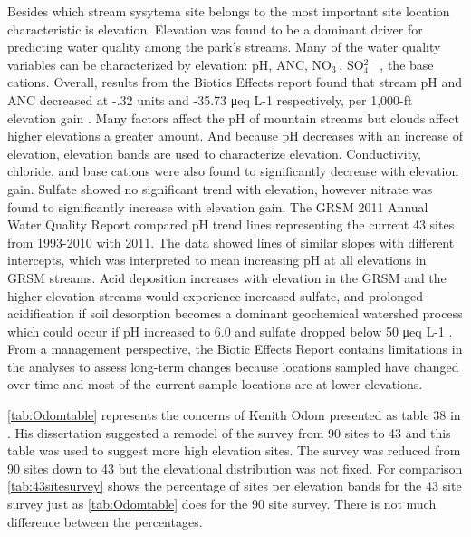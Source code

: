 Besides which stream sysytema site belongs to the most important site location characteristic is elevation.
Elevation was found to be a dominant driver for predicting water quality among the park's streams. %
Many of the water quality variables can be characterized by elevation: pH, ANC, NO$_3^-$, SO$_4^{2-}$, the base cations.
Overall, results from the Biotics Effects report found that stream pH and ANC decreased at -.32 units and -35.73 μeq L-1 respectively, per 1,000-ft elevation gain \citep{cai2013}. 
Many factors affect the pH of mountain streams but clouds affect higher elevations a greater amount.
And because pH decreases with an increase of elevation, elevation bands are used to characterize elevation.
Conductivity, chloride, and base cations were also found to significantly decrease with elevation gain.  
Sulfate showed no significant trend with elevation, however nitrate was found to significantly increase with elevation gain.  
The GRSM 2011 Annual Water Quality Report compared pH trend lines representing the current 43 sites from 1993-2010 with 2011.  
The data showed lines of similar slopes with different intercepts, which was interpreted to mean increasing pH at all elevations in GRSM streams.  
Acid deposition increases with elevation in the GRSM and the higher elevation streams would experience increased sulfate, and prolonged acidification if soil desorption becomes a dominant geochemical watershed process which could occur if pH increased to 6.0 and sulfate dropped below 50 μeq L-1 \citep{annualreport2012}.  
From a management perspective, the Biotic Effects Report contains limitations in the analyses to assess long-term changes because locations sampled have changed over time and most of the current sample locations are at lower elevations.





\autoref{tab:Odomtable} represents the concerns of Kenith Odom presented as table 38 in \citet{odom2003}.
His dissertation suggested a remodel of the survey from 90 sites to 43 and this table was used to suggest more high elevation sites.
The survey was reduced from 90 sites down to 43 but the elevational distribution was not fixed.
For comparison \autoref{tab:43sitesurvey} shows the percentage of sites per elevation bands for the 43 site survey just as \autoref{tab:Odomtable} does for the 90 site survey.
There is not much difference between the percentages.

